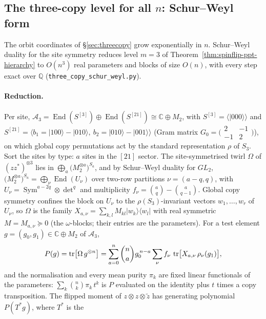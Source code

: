 \subsection{The three-copy level for all $n$: Schur--Weyl form}\label{sec:threecopy-sw}

The orbit coordinates of \S\ref{sec:threecopy} grow exponentially in $n$. Schur--Weyl duality for the
site symmetry reduces level $m=3$ of Theorem~\ref{thm:spinflip-ppt-hierarchy} to $O(n^3)$ real
parameters and blocks of size $O(n)$, with every step exact over $\mathbb Q$
(\texttt{three\_copy\_schur\_weyl.py}).

\paragraph{Reduction.} Per site, $\mathcal A_3=\operatorname{End}(S^{[3]})\oplus\operatorname{End}(S^{[21]})
\cong\mathbb C\oplus M_2$, with $S^{[3]}=\langle|000\rangle\rangle$ and
$S^{[21]}=\langle b_1=|100\rangle-|010\rangle,\ b_2=|010\rangle-|001\rangle\rangle$ (Gram matrix
$G_0=\bigl(\begin{smallmatrix}2&-1\\-1&2\end{smallmatrix}\bigr)$), on which global copy permutations act
by the standard representation $\rho$ of $S_3$. Sort the sites by type: $a$ sites in the $[21]$ sector.
The site-symmetrised twirl $\Omega$ of $(zz^*)^{\otimes3}$ lies in
$\bigoplus_a\bigl(M_2^{\otimes a}\bigr)^{S_a}$, and by Schur--Weyl duality for $GL_2$,
$\bigl(M_2^{\otimes a}\bigr)^{S_a}=\bigoplus_{\nu}\operatorname{End}(U_\nu)$ over two-row partitions
$\nu=(a-q,q)$, with $U_\nu=\operatorname{Sym}^{a-2q}\otimes{\det}^{q}$ and multiplicity
$f_\nu=\binom aq-\binom a{q-1}$. Global copy symmetry confines the block on $U_\nu$ to the
$\rho(S_3)$-invariant vectors $w_1,\dots,w_r$ of $U_\nu$, so $\Omega$ is the family
$X_{a,\nu}=\sum_{k,l}M_{kl}|w_k\rangle\langle w_l|$ with real symmetric $M=M_{a,\nu}\succeq0$
(the $\omega$-blocks; their entries are the parameters). For a test element $g=(g_0,g_1)\in\mathbb C\oplus M_2$
of $\mathcal A_3$,
\[
 P(g)=\operatorname{tr}\bigl[\Omega\,g^{\otimes n}\bigr]
 =\sum_{a=0}^n\binom na g_0^{\,n-a}\sum_{\nu}f_\nu\,\operatorname{tr}\bigl[X_{a,\nu}\,\rho_\nu(g_1)\bigr],
\]
and the normalisation and every mean purity $\pi_k$ are fixed linear functionals of the parameters:
$\sum_k\binom nk\pi_k\,t^k$ is $P$ evaluated on the identity plus $t$ times a copy transposition.
The flipped moment of $z\otimes z\otimes\tilde z$ has generating polynomial $P(T^*g)$, where $T^*$ is the
